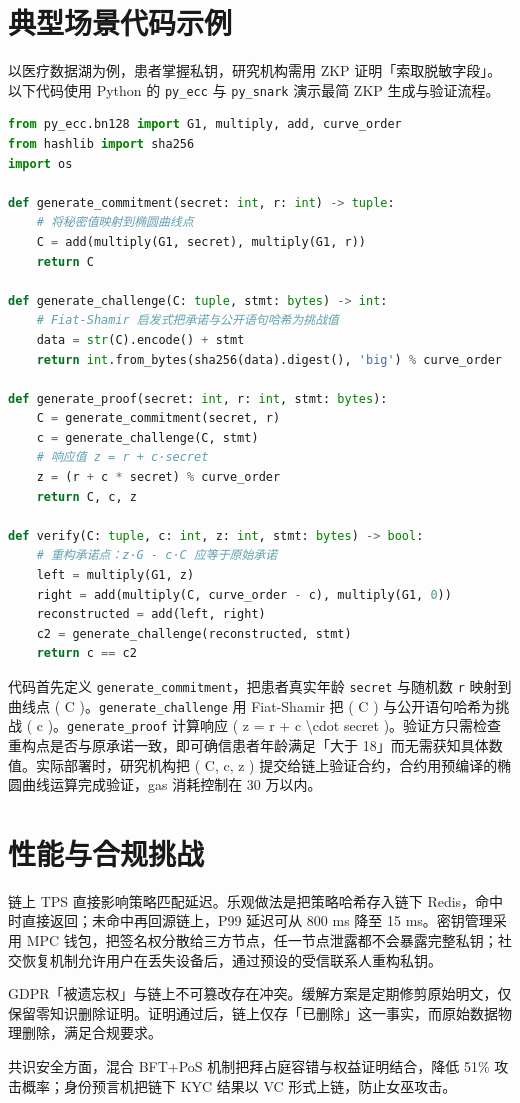 \chapter{典型场景代码示例}
以医疗数据湖为例，患者掌握私钥，研究机构需用 ZKP 证明「索取脱敏字段」。以下代码使用 Python 的 \texttt{py\_{}ecc} 与 \texttt{py\_{}snark} 演示最简 ZKP 生成与验证流程。\par
\begin{lstlisting}[language=python]
from py_ecc.bn128 import G1, multiply, add, curve_order
from hashlib import sha256
import os

def generate_commitment(secret: int, r: int) -> tuple:
    # 将秘密值映射到椭圆曲线点
    C = add(multiply(G1, secret), multiply(G1, r))
    return C

def generate_challenge(C: tuple, stmt: bytes) -> int:
    # Fiat-Shamir 启发式把承诺与公开语句哈希为挑战值
    data = str(C).encode() + stmt
    return int.from_bytes(sha256(data).digest(), 'big') % curve_order

def generate_proof(secret: int, r: int, stmt: bytes):
    C = generate_commitment(secret, r)
    c = generate_challenge(C, stmt)
    # 响应值 z = r + c·secret
    z = (r + c * secret) % curve_order
    return C, c, z

def verify(C: tuple, c: int, z: int, stmt: bytes) -> bool:
    # 重构承诺点：z·G - c·C 应等于原始承诺
    left = multiply(G1, z)
    right = add(multiply(C, curve_order - c), multiply(G1, 0))
    reconstructed = add(left, right)
    c2 = generate_challenge(reconstructed, stmt)
    return c == c2
\end{lstlisting}
代码首先定义 \texttt{generate\_{}commitment}，把患者真实年龄 \texttt{secret} 与随机数 \texttt{r} 映射到曲线点 ( C )。\texttt{generate\_{}challenge} 用 Fiat-Shamir 把 ( C ) 与公开语句哈希为挑战 ( c )。\texttt{generate\_{}proof} 计算响应 ( z = r + c \textbackslash{}cdot secret )。验证方只需检查重构点是否与原承诺一致，即可确信患者年龄满足「大于 18」而无需获知具体数值。实际部署时，研究机构把 ( C, c, z ) 提交给链上验证合约，合约用预编译的椭圆曲线运算完成验证，gas 消耗控制在 30 万以内。\par
\chapter{性能与合规挑战}
链上 TPS 直接影响策略匹配延迟。乐观做法是把策略哈希存入链下 Redis，命中时直接返回；未命中再回源链上，P99 延迟可从 800 ms 降至 15 ms。密钥管理采用 MPC 钱包，把签名权分散给三方节点，任一节点泄露都不会暴露完整私钥；社交恢复机制允许用户在丢失设备后，通过预设的受信联系人重构私钥。\par
GDPR「被遗忘权」与链上不可篡改存在冲突。缓解方案是定期修剪原始明文，仅保留零知识删除证明。证明通过后，链上仅存「已删除」这一事实，而原始数据物理删除，满足合规要求。\par
共识安全方面，混合 BFT+PoS 机制把拜占庭容错与权益证明结合，降低 51\%{} 攻击概率；身份预言机把链下 KYC 结果以 VC 形式上链，防止女巫攻击。\par
